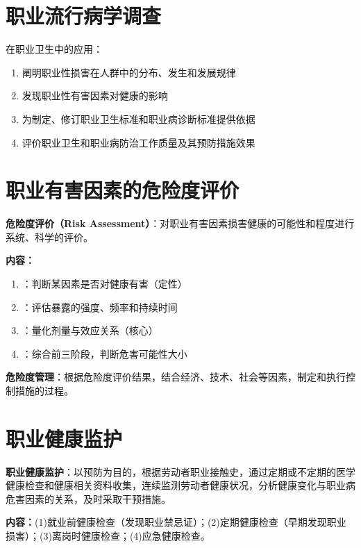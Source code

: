 \section{职业流行病学调查}

在职业卫生中的应用：
\begin{enumerate}[leftmargin=*]
    \item 阐明职业性损害在人群中的分布、发生和发展规律
    \item 发现职业性有害因素对健康的影响
    \item 为制定、修订职业卫生标准和职业病诊断标准提供依据
    \item 评价职业卫生和职业病防治工作质量及其预防措施效果
\end{enumerate}

\section{职业有害因素的危险度评价}

\begin{keybox}
\textbf{危险度评价（Risk Assessment）}：对职业有害因素损害健康的可能性和程度进行系统、科学的评价。

\textbf{内容：}
\begin{enumerate}[leftmargin=*]
    \item {}：判断某因素是否对健康有害（定性）
    \item {}：评估暴露的强度、频率和持续时间
    \item {}：量化剂量与效应关系（核心）
    \item {}：综合前三阶段，判断危害可能性大小
\end{enumerate}

\textbf{危险度管理}：根据危险度评价结果，结合经济、技术、社会等因素，制定和执行控制措施的过程。
\end{keybox}

\section{职业健康监护}

\begin{defbox}
\textbf{职业健康监护}：以预防为目的，根据劳动者职业接触史，通过定期或不定期的医学健康检查和健康相关资料收集，连续监测劳动者健康状况，分析健康变化与职业病危害因素的关系，及时采取干预措施。

\textbf{内容：}(1)就业前健康检查（发现职业禁忌证）；(2)定期健康检查（早期发现职业损害）；(3)离岗时健康检查；(4)应急健康检查。
\end{defbox}

